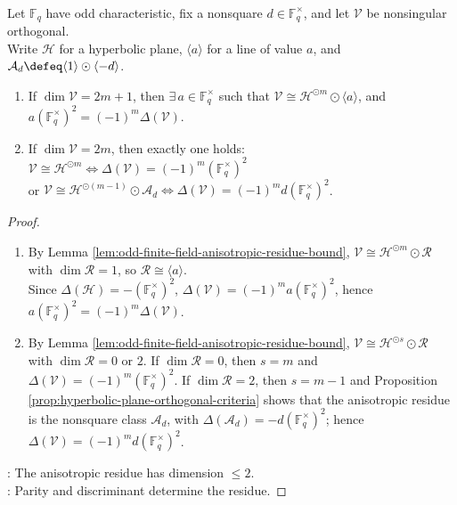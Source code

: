 \begin{theorem} \label{thm:odd-finite-field-witt-decomposition} \\
Let $\mathbb{F}_q$ have odd characteristic, fix a nonsquare $d\in\mathbb{F}_q^{\times}$, and let $\mathcal{V}$ be nonsingular orthogonal.\\
Write $\mathcal{H}$ for a hyperbolic plane, $\langle a\rangle$ for a line of value $a$, and $\mathcal{A}_d\defeq\langle1\rangle\odot\langle-d\rangle$.
\begin{enumerate}[label=(\roman*)]
\setlength{\itemsep}{0pt}
\item If $\dim\mathcal{V}=2m+1$, then $\exists\,a\in\mathbb{F}_q^{\times}$ such that $\mathcal{V}\cong\mathcal{H}^{\odot m}\odot\langle a\rangle$, and $a(\mathbb{F}_q^{\times})^2=(-1)^m\Delta(\mathcal{V})$.
\item If $\dim\mathcal{V}=2m$, then exactly one holds: $\mathcal{V}\cong\mathcal{H}^{\odot m} \iff \Delta(\mathcal{V})=(-1)^m(\mathbb{F}_q^{\times})^2$\\
or $\mathcal{V}\cong\mathcal{H}^{\odot(m-1)}\odot\mathcal{A}_d \iff \Delta(\mathcal{V})=(-1)^m d(\mathbb{F}_q^{\times})^2$.
\end{enumerate}
\begin{proof}
\begin{enumerate}[label=(\roman*)]
\setlength{\itemsep}{0pt}
\item By Lemma \ref{lem:odd-finite-field-anisotropic-residue-bound}, $\mathcal{V}\cong\mathcal{H}^{\odot m}\odot\mathcal{R}$ with $\dim\mathcal{R}=1$, so $\mathcal{R}\cong\langle a\rangle$.\\
Since $\Delta(\mathcal{H})=-(\mathbb{F}_q^{\times})^2$, $\Delta(\mathcal{V})=(-1)^m a(\mathbb{F}_q^{\times})^2$, hence $a(\mathbb{F}_q^{\times})^2=(-1)^m\Delta(\mathcal{V})$.
\item By Lemma \ref{lem:odd-finite-field-anisotropic-residue-bound}, $\mathcal{V}\cong\mathcal{H}^{\odot s}\odot\mathcal{R}$ with $\dim\mathcal{R}=0$ or $2$. If $\dim\mathcal{R}=0$, then $s=m$ and $\Delta(\mathcal{V})=(-1)^m(\mathbb{F}_q^{\times})^2$. If $\dim\mathcal{R}=2$, then $s=m-1$ and Proposition \ref{prop:hyperbolic-plane-orthogonal-criteria} shows that the anisotropic residue is the nonsquare class $\mathcal{A}_d$, with $\Delta(\mathcal{A}_d)=-d(\mathbb{F}_q^{\times})^2$; hence $\Delta(\mathcal{V})=(-1)^m d(\mathbb{F}_q^{\times})^2$.
\end{enumerate}
: The anisotropic residue has dimension $\leq2$.\\
: Parity and discriminant determine the residue.
\end{proof}
\end{theorem}

